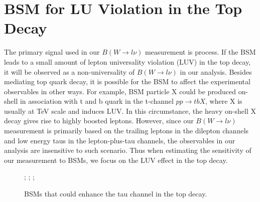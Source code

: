 

\section{BSM for LU Violation in the Top Decay}
\label{sec:relatedWorks:bsm}

The primary signal used in our $B(W\to l \nu )$ measurement is \ttbar process. If the BSM leads to a small amount of lepton universality violation (LUV) in the top decay, it will be observed as a non-universality of $B(W\to l \nu )$ in our analysis. Besides mediating top quark decay, it is possible for the BSM to affect the experimental observables in other ways. For example, BSM particle X could be produced on-shell in association with t and b quark in the t-channel $pp \to t b X$, where X is usually at TeV scale and induces LUV. In this circumstance, the heavy on-shell X decay gives rise to highly boosted leptons.  However, since our $B(W\to l \nu )$ measurement is primarily based on the trailing leptons in the dilepton channels and low energy taus in the lepton-plus-tau channels, the observables in our analysis are insensitive to such scenario. Thus when estimating the sensitivity of our measurement to BSMs, we focus on the LUV effect in the top decay. 

\begin{figure}[ht]
    \centering
    ;\qquad
    ;\qquad
    ;
    \caption{BSMs that could enhance the tau channel in the top decay. }
   \label{fig:relatedWorks:bsm:topdecayBSM}
\end{figure}

